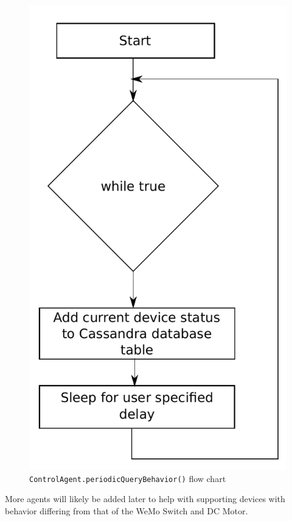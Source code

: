 \documentclass[letterpaper,12pt]{article}   %
\begin{document}
\begin{figure}[H]
    \centering
    \includegraphics[scale=0.75]{figs/periodicQueryBehaviorFlow.pdf}
    \caption{\texttt{ControlAgent.periodicQueryBehavior()} flow chart}
    \label{fig:periodicQueryBehavior}
\end{figure}

More agents will likely be added later to help with supporting devices with behavior differing from that of the WeMo Switch and DC Motor. 
\end{document}
